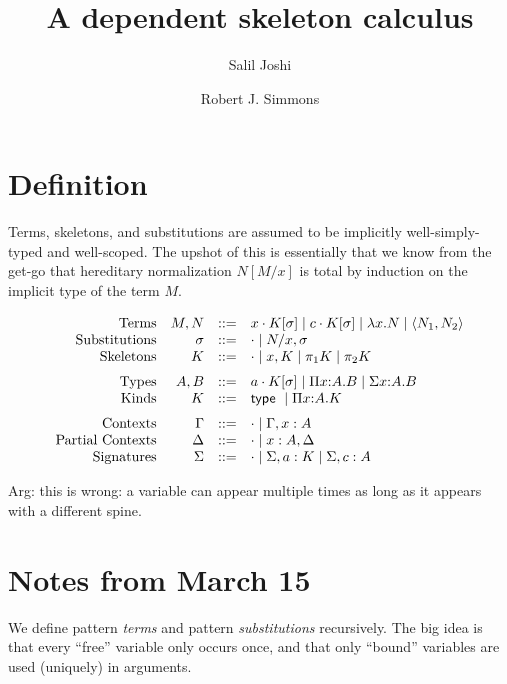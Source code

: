 \documentclass{article}
\begin{document}
\title{A dependent skeleton calculus}
\author{Salil Joshi \and Robert J. Simmons}
\maketitle

\section{Definition}

Terms, skeletons, and substitutions are assumed to be implicitly 
well-simply-typed and well-scoped. The upshot of this is essentially 
that we know from the get-go that hereditary normalization $N[M/x]$ is total 
by induction on the implicit type of the term $M$.

\[
\begin{array}{rrcl}
\mbox{Terms} & M, N & ::= & 
     x \cdot K [ \sigma ] 
\mid c \cdot K [ \sigma ]
\mid \lambda x. N
\mid \langle N_1 , N_2 \rangle 
\\
\mbox{Substitutions} & \sigma & ::= &
     \cdot 
\mid N/x, \sigma
\\
\mbox{Skeletons} & K & ::= &
     \cdot
\mid x, K
\mid \pi_1 K
\mid \pi_2 K
\medskip\\
\mbox{Types} & A,B & ::= &
     a \cdot K [ \sigma ]
\mid \Pi x{:}A.B
\mid \Sigma x{:}A.B
\\
\mbox{Kinds} & K & ::= &
     \mathsf{type} \
\mid \Pi x{:}A.K
\medskip\\
\mbox{Contexts} & \Gamma & ::= & 
     \cdot
\mid \Gamma, x : A
\\
\mbox{Partial Contexts} & \Delta & ::= &
     \cdot
\mid x : A, \Delta
\\
\mbox{Signatures} & \Sigma & ::= &
     \cdot
\mid \Sigma, a : K
\mid \Sigma, c : A
\\
\end{array}
\]

Arg: this is wrong: a variable can appear multiple times as long as it appears with a different spine.

\section{Notes from March 15}

We define pattern {\it terms} and pattern {\it substitutions} recursively.
The big idea is that every ``free'' variable only occurs once, and that
only ``bound'' variables are used (uniquely) in arguments. 
\end{document}
